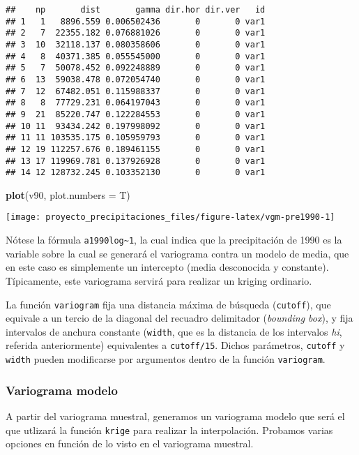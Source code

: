 \documentclass[11pt,]{article}
\newenvironment{Shaded}{\begin{snugshade}}{\end{snugshade}}
\newcommand{\KeywordTok}[1]{\textcolor[rgb]{0.13,0.29,0.53}{\textbf{#1}}}
\newcommand{\DataTypeTok}[1]{\textcolor[rgb]{0.13,0.29,0.53}{#1}}
\newcommand{\NormalTok}[1]{#1}
\begin{document}
\begin{verbatim}
##    np       dist       gamma dir.hor dir.ver   id
## 1   1   8896.559 0.006502436       0       0 var1
## 2   7  22355.182 0.076881026       0       0 var1
## 3  10  32118.137 0.080358606       0       0 var1
## 4   8  40371.385 0.055545000       0       0 var1
## 5   7  50078.452 0.092248889       0       0 var1
## 6  13  59038.478 0.072054740       0       0 var1
## 7  12  67482.051 0.115988337       0       0 var1
## 8   8  77729.231 0.064197043       0       0 var1
## 9  21  85220.747 0.122284553       0       0 var1
## 10 11  93434.242 0.197998092       0       0 var1
## 11 11 103535.175 0.105959793       0       0 var1
## 12 19 112257.676 0.189461155       0       0 var1
## 13 17 119969.781 0.137926928       0       0 var1
## 14 12 128732.245 0.103352130       0       0 var1
\end{verbatim}

\begin{Shaded}
\begin{Highlighting}[]
\KeywordTok{plot}\NormalTok{(v90, }\DataTypeTok{plot.numbers =}\NormalTok{ T)}
\end{Highlighting}
\end{Shaded}

\texttt{[image: proyecto\_precipitaciones\_files/figure-latex/vgm-pre1990-1]}

Nótese la fórmula \texttt{a1990log\textasciitilde{}1}, la cual indica
que la precipitación de 1990 es la variable sobre la cual se generará el
variograma contra un modelo de media, que en este caso es simplemente un
intercepto (media desconocida y constante). Típicamente, este variograma
servirá para realizar un kriging ordinario.

La función \texttt{variogram} fija una distancia máxima de búsqueda
(\texttt{cutoff}), que equivale a un tercio de la diagonal del recuadro
delimitador (\emph{bounding box}), y fija intervalos de anchura
constante (\texttt{width}, que es la distancia de los intervalos
\emph{hi}, referida anteriormente) equivalentes a \texttt{cutoff/15}.
Dichos parámetros, \texttt{cutoff} y \texttt{width} pueden modificarse
por argumentos dentro de la función \texttt{variogram}.

\subsubsection{Variograma modelo}\label{variograma-modelo}

A partir del variograma muestral, generamos un variograma modelo que
será el que utlizará la función \texttt{krige} para realizar la
interpolación. Probamos varias opciones en función de lo visto en el
variograma muestral.
\end{document}
